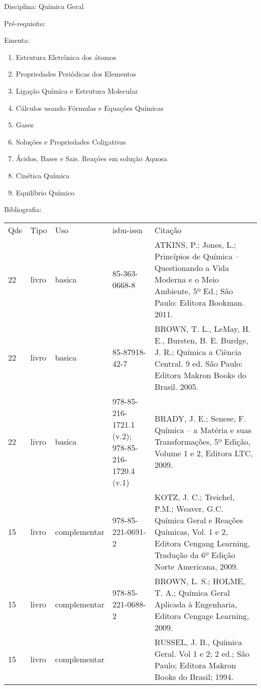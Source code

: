 \documentclass[12pt,a4paper,twoside]{report}
\begin{document}
Disciplina: Química Geral

Pré-requisito:
\begin{enumerate}
\end{enumerate}

Ementa:
\begin{enumerate}
\item Estrutura Eletrônica dos átomos
\item Propriedades Periódicas dos Elementos
\item Ligação Química e Estrutura Molecular
\item Cálculos usando Fórmulas e Equações Químicas
\item Gases
\item Soluções e Propriedades Coligativas
\item Ácidos, Bases e Sais. Reações em solução Aquosa
\item Cinética Química
\item Equilíbrio Químico
\end{enumerate}

Bibliografia:
\begin{tabular}{lllll}
Qde & Tipo & Uso & isbn-issn & Citação \\
22&livro&basica&85-363-0668-8&ATKINS, P.; Jones, L.; Princípios de Química – Questionando a Vida Moderna e o Meio Ambiente, 5º Ed.; São Paulo: Editora Bookman. 2011.\\
22&livro&basica&85-87918-42-7&BROWN, T. L., LeMay, H. E., Bursten, B. E. Burdge, J. R.; Química a Ciência Central. 9 ed. São Paulo: Editora Makron Books do Brasil. 2005.\\
22&livro&basica&978-85-216-1721.1 (v.2); 978-85-216-1720.4 (v.1)&BRADY, J. E.; Senese, F. Química – a Matéria e suas Transformações, 5º Edição, Volume 1 e 2, Editora LTC, 2009.\\
15&livro&complementar&978-85-221-0691-2&KOTZ, J. C.; Treichel, P.M.; Weaver, G.C. Química Geral e Reações Químicas, Vol. 1 e 2, Editora Cengang Learning, Tradução da 6º Edição Norte Americana, 2009.\\
15&livro&complementar&978-85-221-0688-2&BROWN, L. S.; HOLME, T. A.; Química Geral Aplicada à Engenharia, Editora Cengage Learning, 2009.\\
15&livro&complementar&&RUSSEL, J. B., Química Geral. Vol 1 e 2;  2 ed.; São Paulo; Editora Makron Books do Brasil; 1994.\\
\end{tabular}
\end{document}
